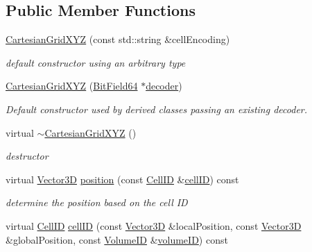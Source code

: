 \subsection*{Public Member Functions}
\begin{DoxyCompactItemize}
\item 
\hyperlink{class_d_d4hep_1_1_d_d_segmentation_1_1_cartesian_grid_x_y_z_a1e888c86452db8dc811b59c7b3298b04}{Cartesian\+Grid\+X\+YZ} (const std\+::string \&cell\+Encoding)
\begin{DoxyCompactList}\small\item\em default constructor using an arbitrary type \end{DoxyCompactList}\item 
\hyperlink{class_d_d4hep_1_1_d_d_segmentation_1_1_cartesian_grid_x_y_z_a0667982b480a2fea3f70a16d8f236e22}{Cartesian\+Grid\+X\+YZ} (\hyperlink{class_d_d4hep_1_1_d_d_segmentation_1_1_bit_field64}{Bit\+Field64} $\ast$\hyperlink{class_d_d4hep_1_1_d_d_segmentation_1_1_segmentation_abec3489982d0fe91ef4b142d9d755576}{decoder})
\begin{DoxyCompactList}\small\item\em Default constructor used by derived classes passing an existing decoder. \end{DoxyCompactList}\item 
virtual \hyperlink{class_d_d4hep_1_1_d_d_segmentation_1_1_cartesian_grid_x_y_z_aff2cbae986ce2cec75de80968a1015a3}{$\sim$\+Cartesian\+Grid\+X\+YZ} ()
\begin{DoxyCompactList}\small\item\em destructor \end{DoxyCompactList}\item 
virtual \hyperlink{struct_d_d4hep_1_1_d_d_segmentation_1_1_vector3_d}{Vector3D} \hyperlink{class_d_d4hep_1_1_d_d_segmentation_1_1_cartesian_grid_x_y_z_ad8d64eb704f1d54553fb9ed24f4bbde4}{position} (const \hyperlink{namespace_d_d4hep_1_1_d_d_segmentation_ac7af071d85cb48820914434a07e21ba1}{Cell\+ID} \&\hyperlink{class_d_d4hep_1_1_d_d_segmentation_1_1_cartesian_grid_x_y_z_acc3af2f1d41a94cbb5bb965e8572096a}{cell\+ID}) const
\begin{DoxyCompactList}\small\item\em determine the position based on the cell ID \end{DoxyCompactList}\item 
virtual \hyperlink{namespace_d_d4hep_1_1_d_d_segmentation_ac7af071d85cb48820914434a07e21ba1}{Cell\+ID} \hyperlink{class_d_d4hep_1_1_d_d_segmentation_1_1_cartesian_grid_x_y_z_acc3af2f1d41a94cbb5bb965e8572096a}{cell\+ID} (const \hyperlink{struct_d_d4hep_1_1_d_d_segmentation_1_1_vector3_d}{Vector3D} \&local\+Position, const \hyperlink{struct_d_d4hep_1_1_d_d_segmentation_1_1_vector3_d}{Vector3D} \&global\+Position, const \hyperlink{namespace_d_d4hep_1_1_d_d_segmentation_a61a6833a18d1800bdef176595f83e3ba}{Volume\+ID} \&\hyperlink{class_d_d4hep_1_1_d_d_segmentation_1_1_segmentation_a43c0e9648e3b7cded015847c0802f757}{volume\+ID}) const

\end{DoxyCompactItemize}
